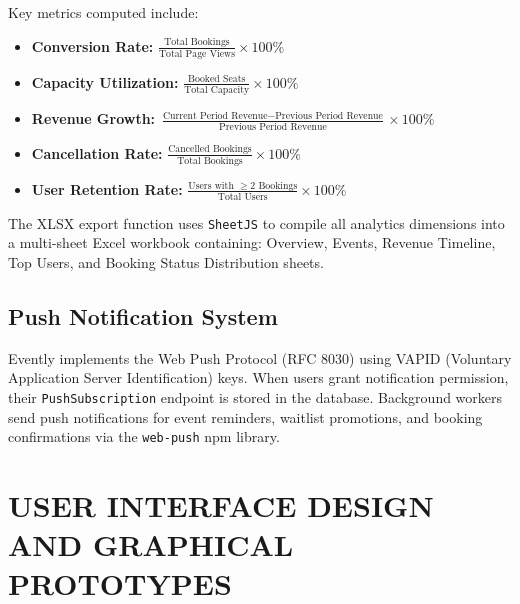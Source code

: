 \documentclass[12pt,a4paper]{report}
\begin{document}
Key metrics computed include:
\begin{itemize}[leftmargin=2em]
    \item \textbf{Conversion Rate:} $\frac{\text{Total Bookings}}{\text{Total Page Views}} \times 100\%$
    \item \textbf{Capacity Utilization:} $\frac{\text{Booked Seats}}{\text{Total Capacity}} \times 100\%$
    \item \textbf{Revenue Growth:} $\frac{\text{Current Period Revenue} - \text{Previous Period Revenue}}{\text{Previous Period Revenue}} \times 100\%$
    \item \textbf{Cancellation Rate:} $\frac{\text{Cancelled Bookings}}{\text{Total Bookings}} \times 100\%$
    \item \textbf{User Retention Rate:} $\frac{\text{Users with } \geq 2 \text{ Bookings}}{\text{Total Users}} \times 100\%$
\end{itemize}

The XLSX export function uses \texttt{SheetJS} to compile all analytics dimensions into a multi-sheet Excel workbook containing: Overview, Events, Revenue Timeline, Top Users, and Booking Status Distribution sheets.

\section{Push Notification System}
Evently implements the Web Push Protocol (RFC 8030) using VAPID (Voluntary Application Server Identification) keys. When users grant notification permission, their \texttt{PushSubscription} endpoint is stored in the database. Background workers send push notifications for event reminders, waitlist promotions, and booking confirmations via the \texttt{web-push} npm library.
\chapter{USER INTERFACE DESIGN AND GRAPHICAL PROTOTYPES}
\end{document}
